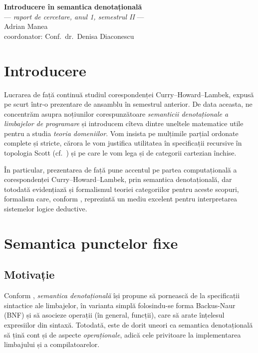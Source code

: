 \documentclass[12pt, a4paper]{article}
\begin{document}
\begin{center}
  {{\Large\textbf{Introducere în semantica denotațională}} \\
    --- \textit{raport de cercetare, anul 1, semestrul II} --- \\
    Adrian Manea \\
    coordonator: Conf.\ dr.\ Denisa Diaconescu
  }
\end{center}

\vspace{2cm}

\tableofcontents

\section{Introducere}
\indent\indent Lucrarea de față continuă studiul corespondenței Curry--Howard--Lambek,
expusă pe scurt într-o prezentare de ansamblu în semestrul anterior. De data aceasta,
ne concentrăm asupra noțiunilor corespunzătoare \emph{semanticii denotaționale a %
  limbajelor de programare} și introducem cîteva dintre uneltele matematice utile
pentru a studia \emph{teoria domeniilor}. Vom insista pe mulțimile parțial ordonate
complete și stricte, cărora le vom justifica utilitatea în specificații recursive
în topologia Scott (cf.\ \cite{scottstrachey}) și pe care le vom lega și de categorii
cartezian închise.

În particular, prezentarea de față pune accentul pe partea computațională a
co\-res\-pon\-den\-ței Curry--Howard--Lambek, prin semantica denotațională, dar totodată
evidențiază și formalismul teoriei categoriilor pentru aceste scopuri, formalism
care, conform \cite{lambek}, reprezintă un mediu excelent pentru interpretarea
sistemelor logice deductive.


\section{Semantica punctelor fixe}

\subsection{Motivație}

\indent\indent Conform \cite{schm}, \emph{semantica denotațională} își propune să pornească de la
spe\-ci\-fi\-ca\-ții sintactice ale limbajelor, în varianta simplă folosindu-se
forma Backus-Naur (BNF) și să asocieze operații (în general, funcții),
care să arate înțelesul expresiilor din sintaxă. Totodată, este de dorit
uneori ca semantica denotațională să țină cont și de aspecte \emph{operaționale},
adică cele privitoare la implementarea limbajului și a compilatoarelor.
\end{document}
